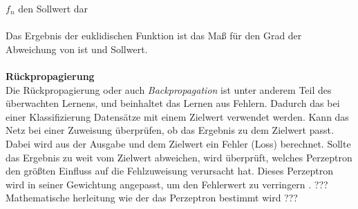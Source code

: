 \documentclass[a4paper,12pt,oneside]{article}
\begin{document}
	$f_{n}$ den Sollwert dar\\\\
Das Ergebnis der euklidischen Funktion ist das Maß für den Grad der Abweichung von ist und Sollwert.\\\\
\textbf{Rückpropagierung}\\
Die Rückpropagierung oder auch \textit{Backpropagation} \cite{ertel2013grundkurs} ist unter anderem Teil des überwachten Lernens, und beinhaltet das Lernen aus Fehlern. Dadurch das bei einer Klassifizierung Datensätze mit einem Zielwert verwendet werden. Kann das Netz bei einer Zuweisung überprüfen, ob das Ergebnis zu dem Zielwert passt. Dabei wird aus der Ausgabe und dem Zielwert ein Fehler (Loss) berechnet. Sollte das Ergebnis zu weit vom Zielwert abweichen, wird überprüft, welches Perzeptron den größten Einfluss auf die Fehlzuweisung verursacht hat. Dieses Perzeptron wird in seiner Gewichtung angepasst, um den Fehlerwert zu verringern \cite{goodfellow2016deep}. 
??? Mathematische herleitung wie der das Perzeptron bestimmt wird ??? 
\end{document}
